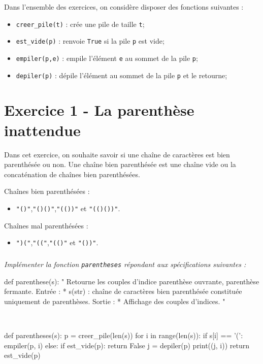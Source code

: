 Dans l'ensemble des exercices, on considère disposer des fonctions suivantes :
\begin{itemize}
\item \texttt{creer\_pile(t)} : crée une pile de taille \texttt{t};
\item \texttt{est\_vide(p)} : renvoie \texttt{True} si la pile \texttt{p} est vide;
\item \texttt{empiler(p,e)} : empile l'élément \texttt{e} au sommet de la pile \texttt{p};
\item \texttt{depiler(p)} : dépile l'élément au sommet de la pile \texttt{p} et le retourne;
\end{itemize}
\section*{Exercice 1 - La parenthèse inattendue}
Dans cet exercice, on souhaite savoir si une chaîne de caractères est bien parenthésée ou non. 
Une chaîne bien parenthésée est une chaîne vide ou la concaténation de chaînes bien parenthésées. 
\begin{exemple}
Chaînes bien parenthésées :
\begin{itemize}
\item \texttt{"()"},\texttt{"()()"},\texttt{"(())"} et \texttt{"(()())"}.
\end{itemize}
Chaînes mal parenthésées :
\begin{itemize}
\item \texttt{")("},\texttt{"(("},\texttt{"(()"} et \texttt{"())"}.
\end{itemize}
\end{exemple} 

\subparagraph{}\textit{Implémenter la fonction \texttt{parentheses} répondant aux spécifications suivantes : }

\begin{py}
\begin{python}
def parenthese(s):
    "
    Retourne les couples d'indice parenthèse 
    ouvrante, parenthèse fermante.
    Entrée :
     * s(str) : chaîne de caractères bien 
     parenthésée constituée uniquement 
     de parenthèses.
    Sortie : 
     * Affichage des couples d'indices.
    "
\end{python}
\end{py}

\ifprof
\begin{corrige}
~\\
\begin{python}
def parentheses(s):
    p = creer_pile(len(s))
    for i in range(len(s)):
    if s[i] == '(':
        empiler(p, i)
    else:
        if est_vide(p):
            return False
        j = depiler(p)
        print((j, i))
    return est_vide(p)
\end{python}
\end{corrige}
\else
\fi

